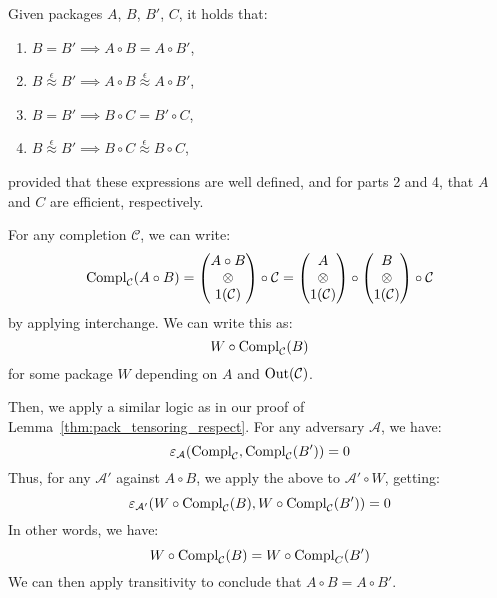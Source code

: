 \begin{lemma}
    Given packages $A$, $B$, $B'$, $C$, it holds that:
    \begin{enumerate}
        \item $B = B' \implies A \circ B = A \circ B'$,
        \item $B \overset{\epsilon}{\approx} B' \implies A \circ B \overset{\epsilon}{\approx} A \circ B'$,
        \item $B = B' \implies B \circ C = B' \circ C$,
        \item $B \overset{\epsilon}{\approx} B' \implies B \circ C \overset{\epsilon}{\approx} B \circ C$,
    \end{enumerate}
    provided that these expressions are well defined, and for parts 2 and 4,
    that $A$ and $C$ are efficient, respectively.


     For any completion $\mathcal{C}$, we can write:
    $$
    \text{Compl}_{\mathcal{C}}(A \circ B) =
    \begin{pmatrix}
        A \circ B\cr
        \otimes\cr
        1(\mathcal{C})
    \end{pmatrix}
    \circ \mathcal{C}
    =
    \begin{pmatrix}
        A\cr
        \otimes\cr
        1(\mathcal{C})
    \end{pmatrix}
    \circ
    \begin{pmatrix}
        B\cr
        \otimes\cr
        1(\mathcal{C})
    \end{pmatrix}
    \circ \mathcal{C}
    $$
    by applying interchange.
    We can write this as:
    $$
    W \circ \text{Compl}_{\mathcal{C}}(B)
    $$
    for some package $W$ depending on $A$ and $\text{Out}(\mathcal{C})$.

    Then, we apply a similar logic as in our proof of Lemma~\ref{thm:pack_tensoring_respect}.
    For any adversary $\mathcal{A}$, we have:
    $$
    \varepsilon_{\mathcal{A}}(\text{Compl}_{\mathcal{C}}, \text{Compl}_{\mathcal{C}}(B')) = 0
    $$
    Thus, for any $\mathcal{A}'$ against $A \circ B$, we apply the above
    to $\mathcal{A}' \circ W$, getting:
    $$
    \varepsilon_{\mathcal{A}'}(W \circ \text{Compl}_{\mathcal{C}}(B), W \circ \text{Compl}_{\mathcal{C}}(B')) = 0
    $$
    In other words, we have:
    $$
    W \circ \text{Compl}_{\mathcal{C}}(B) = W \circ \text{Compl}_{C}(B')
    $$
    We can then apply transitivity to conclude that $A \circ B = A \circ B'$.


\end{lemma}
